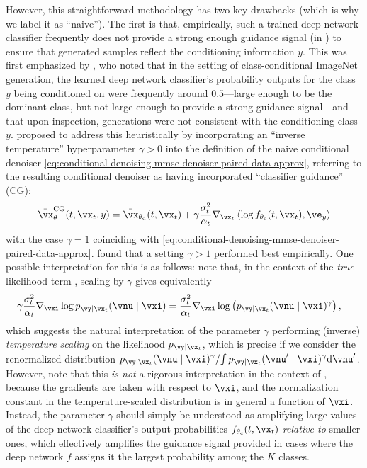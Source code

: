 \documentclass[../../book-main.tex]{subfiles}
\begin{document}
However, this straightforward methodology has two key drawbacks (which is why we
label it as ``naive''). The first is
that, empirically, such a trained deep network classifier frequently does not
provide a strong enough guidance signal (in
) to ensure that
generated samples reflect the conditioning information $y$. This was first
emphasized by \citet{Dhariwal2021-hg}, who noted that in the setting of
class-conditional ImageNet generation, the learned deep network
classifier's probability outputs for the class $y$ being conditioned on were
frequently around
$0.5$---large enough to be the dominant class, but not large enough to provide
a strong guidance signal---and that upon inspection, generations were not
consistent with the conditioning class $y$. \citet{Dhariwal2021-hg} proposed to
address this heuristically by incorporating an ``inverse temperature''
hyperparameter $\gamma > 0$
into the definition of the naive conditional denoiser
\eqref{eq:conditional-denoising-mmse-denoiser-paired-data-approx}, referring to the
resulting conditional denoiser as having incorporated ``classifier guidance''
(CG):
\begin{equation}\label{eq:conditional-denoising-mmse-denoiser-paired-data-approx-cg}
  \bar{\vx}_{\theta}^{\mathrm{CG}}(t, \vx_t, y)
  =
  \bar{\vx}_{\theta_{\mathrm{d}}}(t, \vx_t)
  + \gamma\frac{\sigma_t^2}{\alpha_t}
  \nabla_{\vx_t}
  \ip*{
    \log f_{\theta_{\mathrm{c}}}(t, \vx_t)
  }{
    \ve_{y}
  }
\end{equation}
with the case $\gamma = 1$ coinciding with
\eqref{eq:conditional-denoising-mmse-denoiser-paired-data-approx}.
\citet{Dhariwal2021-hg} found that a setting $\gamma > 1$ performed best empirically.
One possible interpretation for this is as follows: note that, in the context of
the \textit{true} likelihood term
, scaling by $\gamma$
gives equivalently
\begin{align}
  \gamma\frac{\sigma_t^2}{\alpha_t} \nabla_{\vxi}\log p_{\vy \mid \vx_t}(\vnu\mid
  \vxi)
  &=
  \frac{\sigma_t^2}{\alpha_t} \nabla_{\vxi}\log \left(
  p_{\vy \mid \vx_t}(\vnu\mid \vxi)^\gamma
  \right), %
\end{align}
which suggests the natural interpretation of the parameter $\gamma$ performing
(inverse) \textit{temperature scaling} on the likelihood
$p_{\vy \mid \vx_t}$, which is precise if we consider the renormalized
distribution 
$ { p_{\vy \mid \vx_t}(\vnu\mid \vxi)^\gamma } / { \int p_{\vy \mid \vx_t}(\vnu'\mid
\vxi)^\gamma \odif \vnu' } $.
However, note that this \textit{is not} a rigorous interpretation in the context
of , because the
gradients are taken with respect to $\vxi$, and the normalization constant in
the temperature-scaled distribution is in general a function of $\vxi$.
Instead, the parameter $\gamma$ should simply be understood as amplifying large
values of the deep network classifier's output probabilities
$f_{\theta_{\mathrm{c}}}(t, \vx_t)$ \textit{relative to} smaller ones,
which effectively amplifies the guidance signal provided in cases where the deep
network $f$ assigns it the largest probability among the $K$ classes.
\end{document}
